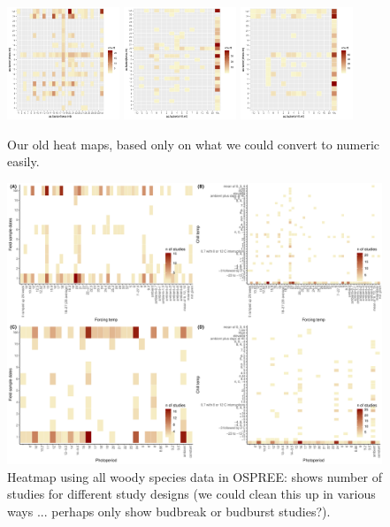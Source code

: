 \documentclass[11pt,letter]{article}
\begin{document}
\begin{figure}[t!]
\centering
\includegraphics[width=0.3\textwidth]{..//..//analyses/limitingcues/figures/heatmapforcexphoto.pdf}
\includegraphics[width=0.3\textwidth]{..//..//analyses/limitingcues/figures/heatmapchillxforce.pdf}
\includegraphics[width=0.3\textwidth]{..//..//analyses/limitingcues/figures/heatmapchillxphoto.pdf}
\caption{Our old heat maps, based only on what we could convert to numeric easily.}
  \label{fig:heatmaps}
\end{figure}


\begin{figure}[t!]
\centering
\includegraphics[width=1\textwidth]{..//..//analyses/limitingcues/figures/heatallosp_4panel.pdf}
\caption{Heatmap using all woody species data in OSPREE: shows number of studies for different study designs (we could clean this up in various ways ... perhaps only show budbreak or budburst studies?).}
  \label{fig:heatmap4p}
\end{figure}
\end{document}
